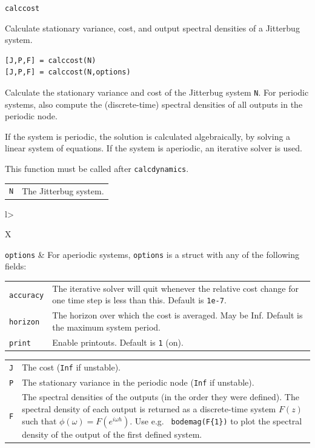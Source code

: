 \documentclass[final,twoside]{rapport}  %
\begin{document}
\seealso
{\tt calccost}


\label{sec:calccost}

\purpose
Calculate stationary variance, cost, and output spectral densities of
a {\sc Jitterbug} system.

\syntax
\begin{verbatim}
[J,P,F] = calccost(N)
[J,P,F] = calccost(N,options)
\end{verbatim}

\descr
Calculate the stationary variance and cost of the {\sc Jitterbug}
system {\tt N}. For periodic systems, also compute the (discrete-time)
spectral densities of all outputs in the periodic node.

If the system is periodic, the solution is calculated
algebraically, by solving a linear system of equations. If the system
is aperiodic, an iterative solver is used.
 
This function must be called after {\tt calcdynamics}.

\args
\begin{tabularx}{\hsize}{l>{\raggedright\arraybackslash}X}
{\tt N} & The {\sc Jitterbug} system.
\end{tabularx}

\optargs
\begin{tabularx}{\hsize}{l>{\raggedright\arraybackslash}X}
{\tt options} &  For aperiodic systems, {\tt options} is a struct with
any of the following fields:

\begin{tabular}{lp{0.8\hsize}}
{\tt accuracy} &   The iterative solver will quit whenever the relative
                        cost change for one time step is less than
                        this. Default is {\tt 1e-7}.\\
{\tt horizon} & The horizon over which the cost is averaged. May be
Inf. Default is the maximum system period.\\
{\tt print} &     Enable printouts. Default is {\tt 1} (on).
\end{tabular}
\end{tabularx}
             
\retvals
\begin{tabularx}{\hsize}{l>{\raggedright\arraybackslash}X}
  {\tt J}      &    The cost ({\tt Inf} if unstable).\\
  {\tt P}      &    The stationary variance in the periodic node
  ({\tt Inf} if unstable).\\
  {\tt F}   &  The spectral densities of the outputs (in the
  order they were defined). The spectral density of each output is
  returned as a discrete-time system $F(z)$ such that $\phi(\omega) = 
  F(e^{i\omega h})$. Use e.g. {\tt
    bodemag(F\{1\})} to plot the spectral density of the
  output of the first defined system.

\end{tabularx}
\end{document}
